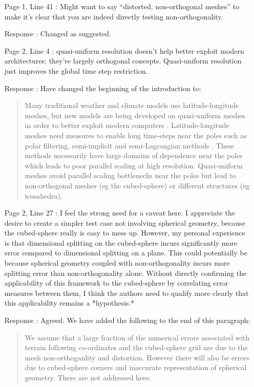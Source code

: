 \documentclass[12pt]{article}
\begin{document}
\begin{enumerate}
\item [Page 1, Line 41]: Might want to say ``distorted, non-orthogonal meshes'' to make it's clear that you are indeed directly testing non-orthogonality.

\item [Response]: Changed as suggested.

\item [Page 2, Line 4]: quasi-uniform resolution doesn't help better exploit modern architectures; they're largely orthogonal concepts. Quasi-uniform resolution just improves the global time step restriction.

\item [Response]: Have changed the beginning of the introduction to:
\begin{quote}
Many traditional weather and climate models use latitude-longitude meshes, but new models are being developed on quasi-uniform meshes in order to better exploit modern computers \cite[eg][]{WTC12,LUJ+14,ST12,SG11,KNK15}. Latitude-longitude meshes need measures to enable long time-steps near the poles such as polar filtering, semi-implicit and semi-Lagrangian methods \cite[]{DCM+05}. These methods necessarily have large domains of dependence near the poles which leads to poor parallel scaling at high resolution. Quasi-uniform meshes avoid parallel scaling bottlenecks near the poles but lead to non-orthogonal meshes (eg the cubed-sphere) or different structures (eg icosahedra).
\end{quote}

\item [Page 2, Line 27]: I feel the strong need for a caveat here. I appreciate the desire to create a simpler test case not involving spherical geometry, because the cubed-sphere really is easy to mess up. However, my personal experience is that dimensional splitting  on the cubed-sphere incurs significantly more error compared to dimensional splitting on a plane. This could potentially be because spherical geometry coupled with non-orthogonality incurs more splitting error than non-orthogonality alone. Without directly confirming the applicability of this framework to the cubed-sphere by correlating error measures between them, I think the authors need to qualify more clearly that this applicability remains a *hypothesis.*

\item [Response]: Agreed. We have added the following to the end of this paragraph:
\begin{quote}
We assume that a large fraction of the numerical errors associated with terrain following co-ordinates and the cubed-sphere grid are due to the mesh non-orthoganlity and distortion. However there will also be errors due to cubed-sphere corners and inaccurate representation of spherical geometry. There are not addressed here. 
\end{quote}


\end{enumerate}
\end{document}
